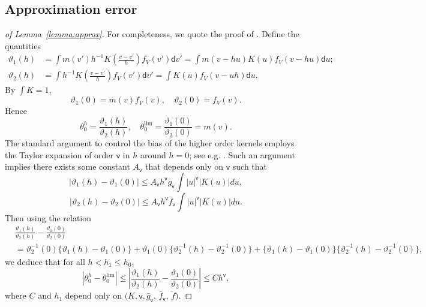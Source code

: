 \subsection{Approximation error}

\begin{proof}[of Lemma~\ref{lemma:approx}]
For completeness, we quote the proof of \cite[Lemma 3.6]{chernozhukov2018global}. Define the quantities
\begin{align*}
    \vartheta_1(h) &=  \int m(v') h^{-1} K\left(\frac{v-v'}{h} \right) f_V(v') \mathsf{d} v'= \int m(v - h u) K(u) f_V(v - hu)\mathsf{d} u;\\
    \vartheta_2(h) &=  \int  h^{-1} K\left(\frac{v-v'}{h} \right) f_V(v') \mathsf{d} v' = \int   K(u) f_V(v- u h) \mathsf{d} u.
\end{align*}
By $\int K  =1 $,
$$
\vartheta_1(0) = m(v) f_V(v), \quad \vartheta_2(0) = f_V(v). 
$$
Hence$$
\theta^h_0 = \frac{\vartheta_1(h) }{\vartheta_2(h)},  \quad \theta_0^{\lim} = \frac{\vartheta_1(0) }{\vartheta_2(0)} = m(v). $$
The standard argument to control the bias of the higher order kernels employs the Taylor expansion of order $\mathsf{v}$ in $h$ around $h=0$; see e.g. \cite[Lemma B2]{newey1994kernel}. Such an argument implies there exists some constant $A_{\mathsf{v}}$ that depends only on  $\mathsf{v}$ such that 
$$
| \vartheta_1(h) - \vartheta_1(0)| \leq A_{\mathsf{v}} h^{ \mathsf{v}} \bar g_\mathsf{v} \int |  u|^{\mathsf{v}} | K(u)| du,
$$$$
| \vartheta_2(h) - \vartheta_2(0)| \leq A_{\mathsf{v}} h^{\mathsf{v}} \bar f_\mathsf{v} \int |  u|^{\mathsf{v}} | K(u)| du.
$$
Then using the relation
\begin{align*}
    &\frac{\vartheta_1(h) }{\vartheta_2(h)} - \frac{\vartheta_1(0) }{\vartheta_2(0)} \\ 
    &=
 \vartheta^{-1}_2(0) \{\vartheta_1(h)  - \vartheta_1(0)\}+  \vartheta_1(0) \{\vartheta_2^{-1}(h)-\vartheta_2^{-1}(0)\}+   \{\vartheta_1(h)  - \vartheta_1(0)\}\{\vartheta_2^{-1}(h)-\vartheta_2^{-1}(0)\},
\end{align*}
we deduce that for all $h< h_1\leq h_0$,
$$
|\theta_0^h  - \theta_0^{\lim}| \leq  \left | \frac{\vartheta_1(h) }{\vartheta_2(h)} - \frac{\vartheta_1(0) }{\vartheta_2(0)}  \right | \leq C h^{\mathsf{v}}, 
$$
where $C$ and $h_1$ depend  only on $(K, \mathsf{v}, \bar g_{\mathsf{v}}$,  $\bar f_{\mathsf{v}}$, $\tilde{f})$.
\end{proof}

